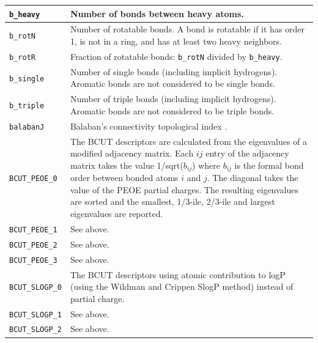 \documentclass[12pt,a4paper]{article}
\begin{document}
\begin{longtable}{@{\zz}|p{}|p{}|}
\texttt{b\_heavy} & Number of bonds between heavy atoms.\\ \hline

\texttt{b\_rotN} & Number of rotatable bonds. A bond is rotatable if it has 
order 1, is not in a ring, and has at least two heavy neighbors.\\ \hline

\texttt{b\_rotR} & Fraction of rotatable bonds: \texttt{b\_rotN} divided by 
\texttt{b\_heavy}.\\ \hline

\texttt{b\_single} & Number of single bonds (including implicit hydrogens). 
Aromatic bonds are not considered to be single bonds.\\ \hline

\texttt{b\_triple} & Number of triple bonds (including implicit hydrogens). 
Aromatic bonds are not considered to be triple bonds.\\ \hline

\texttt{balabanJ} & Balaban's connectivity topological index 
\cite{Balaban1982}.\\ \hline

\texttt{BCUT\_PEOE\_0} & The BCUT descriptors \cite{Pearlman1998} are 
calculated from the eigenvalues of a modified adjacency matrix. Each $ij$ entry 
of the adjacency matrix takes the value 1/sqrt($b_{ij}$) where $b_{ij}$ is the 
formal bond order between bonded atoms $i$ and $j$. The diagonal takes the 
value of the PEOE partial charges. The resulting eigenvalues are sorted and 
the smallest, 1/3-ile, 2/3-ile and largest eigenvalues are reported.\\ \hline

\texttt{BCUT\_PEOE\_1} & See above.\\ \hline

\texttt{BCUT\_PEOE\_2} & See above.\\ \hline

\texttt{BCUT\_PEOE\_3} & See above.\\ \hline

\texttt{BCUT\_SLOGP\_0} & The BCUT descriptors using atomic contribution to 
logP (using the Wildman and Crippen SlogP method) instead of partial 
charge.\\ \hline

\texttt{BCUT\_SLOGP\_1} & See above.\\ \hline

\texttt{BCUT\_SLOGP\_2} & See above.\\ \hline


\end{longtable}
\end{document}
